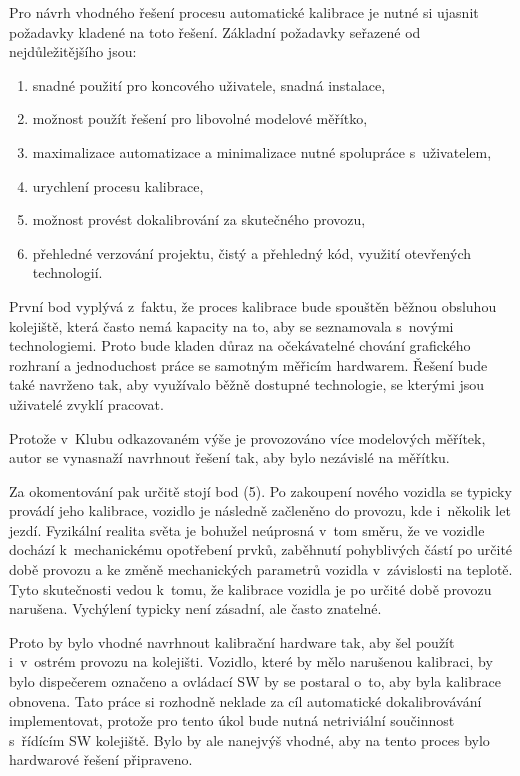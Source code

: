 Pro návrh vhodného řešení procesu automatické kalibrace je nutné si ujasnit
požadavky kladené na toto řešení. Základní požadavky seřazené od
nejdůležitějšího jsou:

\begin{enumerate}
	\item snadné použití pro koncového uživatele, snadná instalace,
	\item možnost použít řešení pro libovolné modelové měřítko,
	\item maximalizace automatizace a minimalizace nutné spolupráce s~uživatelem,
	\item urychlení procesu kalibrace,
	\item možnost provést dokalibrování za skutečného provozu,
	\item přehledné verzování projektu, čistý a přehledný kód, využití otevřených
	technologií.
\end{enumerate}

První bod vyplývá z~faktu, že proces kalibrace bude spouštěn běžnou obsluhou
kolejiště, která často nemá kapacity na to, aby se seznamovala s~novými
technologiemi. Proto bude kladen důraz na očekávatelné chování grafického
rozhraní a jednoduchost práce se samotným měřicím hardwarem. Řešení bude také
navrženo tak, aby využívalo běžně dostupné technologie, se kterými jsou
uživatelé zvyklí pracovat.

Protože v~Klubu odkazovaném výše je provozováno více modelových měřítek, autor
se vynasnaží navrhnout řešení tak, aby bylo nezávislé na měřítku.

Za okomentování pak určitě stojí bod (5). Po zakoupení nového vozidla se
typicky provádí jeho kalibrace, vozidlo je následně začleněno do provozu, kde
i~několik let jezdí. Fyzikální realita světa je bohužel neúprosná v~tom směru,
že ve vozidle dochází k~mechanickému opotřebení prvků, zaběhnutí pohyblivých
částí po určité době provozu a ke změně mechanických parametrů vozidla
v~závislosti na teplotě. Tyto skutečnosti vedou k~tomu, že kalibrace vozidla
je po určité době provozu narušena. Vychýlení typicky není zásadní, ale často
znatelné.

Proto by bylo vhodné navrhnout kalibrační hardware tak, aby šel použít
i~v~ostrém provozu na kolejišti. Vozidlo, které by mělo narušenou kalibraci,
by bylo dispečerem označeno a ovládací SW by se postaral o~to, aby byla
kalibrace obnovena. Tato práce si rozhodně neklade za cíl automatické
dokalibrovávání implementovat, protože pro tento úkol bude nutná netriviální
součinnost s~řídícím SW kolejiště. Bylo by ale nanejvýš vhodné, aby na tento
proces bylo hardwarové řešení připraveno.

